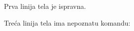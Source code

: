 \documentclass[preview,border=6pt,varwidth=84mm,11pt]{standalone}
\begin{document}
Prva linija tela je ispravna.

Treća linija tela ima nepoznatu komandu: \foo
\end{document}
